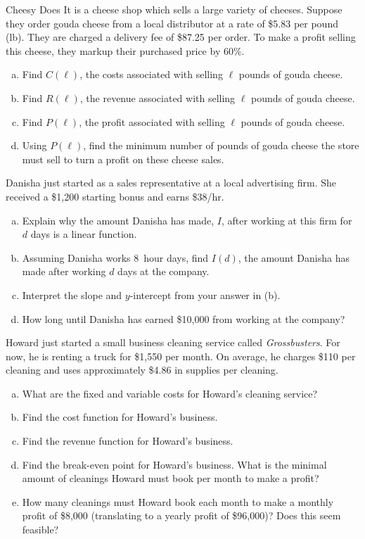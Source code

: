 \documentclass[11pt,letterpaper]{article}
\begin{document}
  
\prob Cheesy Does It is a cheese shop which sells a large variety of cheeses. Suppose they order gouda cheese from a local distributor at a rate of \$5.83 per pound (lb). They are charged a delivery fee of \$87.25 per order. To make a profit selling this cheese, they markup their purchased price by 60\%. 
	\begin{enumerate}[(a)]
	\item Find $C(\ell)$, the costs associated with selling $\ell$ pounds of gouda cheese.
	\item Find $R(\ell)$, the revenue associated with selling $\ell$ pounds of gouda cheese.
	\item Find $P(\ell)$, the profit associated with selling $\ell$ pounds of gouda cheese.
	\item Using $P(\ell)$, find the minimum number of pounds of gouda cheese the store must sell to turn a profit on these cheese sales. 
	\end{enumerate} \pspace 


\prob Danisha just started as a sales representative at a local advertising firm. She received a \$1,200 starting bonus and earns \$38/hr. 
	\begin{enumerate}[(a)]
	\item Explain why the amount Danisha has made, $I$, after working at this firm for $d$ days is a linear function.
	\item Assuming Danisha works 8~hour days, find $I(d)$, the amount Danisha has made after working $d$ days at the company. 
	\item Interpret the slope and $y$-intercept from your answer in (b). 
	\item How long until Danisha has earned \$10,000 from working at the company?
	\end{enumerate} \pspace  


\prob Howard just started a small business cleaning service called \textit{Grossbusters}. For now, he is renting a truck for \$1,550 per month. On average, he charges \$110 per cleaning and uses approximately \$4.86 in supplies per cleaning. 
	\begin{enumerate}[(a)]
	\item What are the fixed and variable costs for Howard's cleaning service?
	\item Find the cost function for Howard's business.
	\item Find the revenue function for Howard's business.
	\item Find the break-even point for Howard's business. What is the minimal amount of cleanings Howard must book per month to make a profit?
	\item How many cleanings must Howard book each month to make a monthly profit of \$8,000 (translating to a yearly profit of \$96,000)? Does this seem feasible? 
	\end{enumerate} \pspace	  
\end{document}
